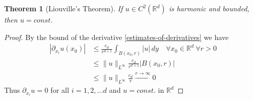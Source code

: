 \documentclass{report}
\theoremstyle{tommy}
\newtheorem{thm}[defn]{Theorem}
\begin{document}

  \begin{thm}[Liouville's Theorem] 
    If \(u \in C^2(\mathbb{R}^d)\) is harmonic and bounded, then \(u = const.\)
  \end{thm}

  \begin{proof}
    By the bound of the derivative \ref{estimates-of-derivatives} we have
    \begin{align*}
      |\partial_{x_i} u(x_0)| 
      &\le \frac{c_d}{r^{d+1}} \int_{B(x_0, r)} |u| \, dy \quad \forall x_0 \in \mathbb{R}^d\ \forall r > 0 \\
      &\le \|u\|_{L^\infty} \frac{c_d}{r^{d+1}} |B(x_0, r)| \\
      &\le \|u\|_{L^\infty} \frac{c_d}{r} \xrightarrow{r \to \infty} 0
    \end{align*}
    Thus \(\partial_{x_i} u = 0\) for all \(i = 1, 2, \dots d\) and \(u = const.\) in \(\mathbb{R}^d\)
  \end{proof}
\end{document}
